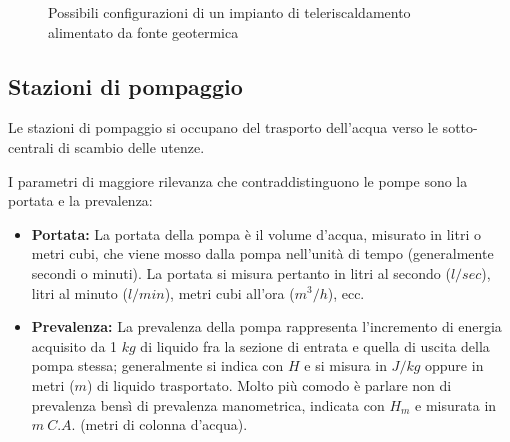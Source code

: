 \documentclass[laurea,oneside,11pt]{USiena_tesiLM}
\begin{document}
 \begin{figure}[!ht]
 \centering
 \hspace{5mm}
 \caption{Possibili configurazioni di un impianto di teleriscaldamento alimentato da fonte geotermica}
 \end{figure}

\subsection{Stazioni di pompaggio}
Le stazioni di pompaggio si occupano del trasporto dell'acqua verso le sotto-centrali di scambio delle utenze.
 
I parametri di maggiore rilevanza che contraddistinguono le pompe sono la portata e la prevalenza:
\begin{itemize}
\item \textbf{Portata:} La portata della pompa è il volume d'acqua, misurato in litri o metri cubi, che viene mosso dalla pompa nell'unità di tempo (generalmente secondi o minuti). La portata si misura pertanto in litri al secondo ($l/sec$), litri al minuto ($l/min$), metri cubi all'ora ($m^3/h$), ecc.
\item \textbf{Prevalenza:} La prevalenza della pompa rappresenta l'incremento di energia acquisito da 1 $kg$ di liquido fra la sezione di entrata e quella di uscita della pompa stessa; generalmente si indica con $H$ e si misura in $J/kg$ oppure in metri ($m$) di liquido trasportato. Molto più comodo è parlare non di prevalenza bensì di prevalenza manometrica, indicata con $H_m$ e misurata in $m \ C.A.$ (metri di colonna d'acqua).
\end{itemize}
\end{document}
